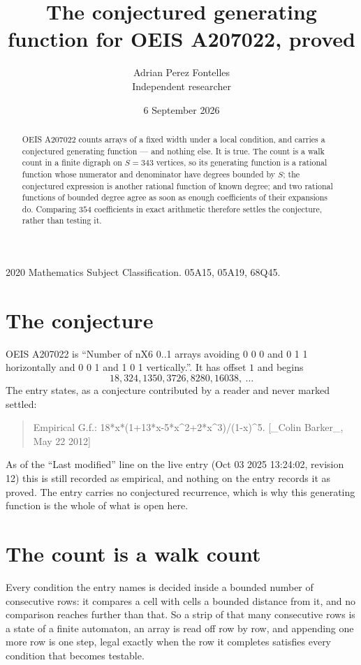\documentclass[11pt,a4paper]{article}
\title{The conjectured generating function for OEIS A207022, proved}
\author{Adrian Perez Fontelles\\ \small Independent researcher}
\date{6 September 2026}
\theoremstyle{plain}
\theoremstyle{definition}
\begin{document}
\maketitle

\begin{abstract}
OEIS A207022 counts arrays of a fixed width under a local condition, and carries a conjectured
generating function --- and nothing else. It is true. The count is a walk count in a finite
digraph on $S=343$ vertices, so its generating function is a rational function whose numerator
and denominator have degrees bounded by $S$; the conjectured expression is another rational
function of known degree; and two rational functions of bounded degree agree as soon as enough
coefficients of their expansions do. Comparing $354$ coefficients in exact arithmetic
therefore settles the conjecture, rather than testing it.
\end{abstract}

\noindent\small 2020 Mathematics Subject Classification. 05A15, 05A19, 68Q45.\normalsize

\section{The conjecture}

OEIS A207022 is ``Number of nX6 0..1 arrays avoiding 0 0 0 and 0 1 1 horizontally and 0 0 1 and 1 0 1 vertically.''. It has offset $1$ and begins
\[
18, 324, 1350, 3726, 8280, 16038,\ \dots
\]
The entry states, as a conjecture contributed by a reader and never marked settled:
\begin{quote}
Empirical G.f.: 18*x*(1+13*x-5*x\^{}2+2*x\^{}3)/(1-x)\^{}5. [\_Colin Barker\_, May 22 2012]
\end{quote}
As of the ``Last modified'' line on the live entry (Oct 03 2025 13:24:02, revision 12) this is still
recorded as empirical, and nothing on the entry records it as proved. The entry carries no
conjectured recurrence, which is why this generating function is the whole of what is open
here.

\section{The count is a walk count}

Every condition the entry names is decided inside a bounded number of consecutive rows: it
compares a cell with cells a bounded distance from it, and no comparison reaches further than
that. So a strip of that many consecutive rows is a state of a finite automaton, an array is
read off row by row, and appending one more row is one step, legal exactly when the row it
completes satisfies every condition that becomes testable.
\end{document}

